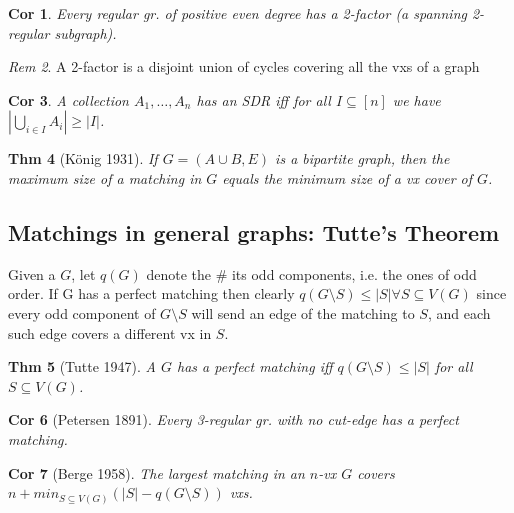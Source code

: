 \documentclass[11pt, fleqn, a4paper, landscape]{article}
\theoremstyle{plain} %
\newtheorem{thm}{Thm}
\newtheorem{cor}[thm]{Cor}
\theoremstyle{remark} %
\newtheorem{rem}[thm]{Rem}
\theoremstyle{definition} %
\newtheorem{defi}[thm]{Def}
\begin{document}
\begin{multicols}{5}
\begin{cor}
Every regular gr. of positive even degree has a 2-factor (a spanning 2-regular subgraph).
\end{cor}

\begin{rem}
A 2-factor is a disjoint union of cycles covering all the vxs of a graph
\end{rem}

\addtocounter{thm}{1}
\begin{cor}
A collection $A_1, \dots ,A_n$ has an SDR iff for all $I \subseteq [n]$ we have $|\bigcup_{i\in I} A_i|\ge|I|$.
\end{cor}
\addtocounter{thm}{1}
\begin{thm}[König 1931]
If $G = (A \cup B,E)$ is a bipartite graph, then the maximum size of a
matching in $G$ equals the minimum size of a vx cover of $G$.
\end{thm}

\subsection{Matchings in general graphs: Tutte’s Theorem}
Given a $G$, let $q(G)$ denote the \# its odd components, i.e. the ones of odd order. If G has a perfect matching then clearly
$q(G\setminus S) \le|S| \forall S \subseteq V (G)$
since every odd component of $G\setminus S$ will send an edge of the matching to $S$, and each such edge covers a different vx in $S$.

\begin{thm}[Tutte 1947]
A $G$ has a perfect matching iff $q(G\setminus S) \le|S|$ for
all $S \subseteq V (G)$.
\end{thm}

\begin{cor}[Petersen 1891]
Every 3-regular gr. with no cut-edge has a perfect matching.
\end{cor}
\addtocounter{thm}{1}
\begin{cor}[Berge 1958]
The largest matching in an $n$-vx $G$ covers $n+min_{S\subseteq V (G)}(|S|- q(G\setminus S))$ vxs.
\end{cor}


\end{multicols}
\end{document}
